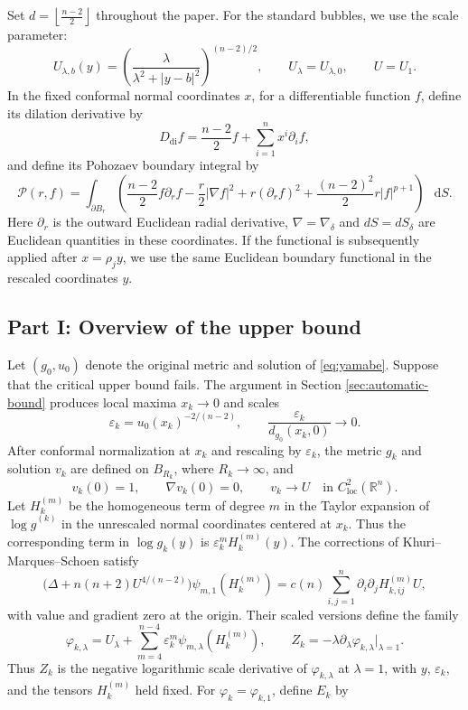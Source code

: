 \documentclass[11pt]{article}
\numberwithin{equation}{section}
\theoremstyle{remark}
\newcommand{\R}{\mathbb R}
\newcommand{\cP}{\mathcal P}
\newcommand{\dd}{\mathop{}\!\mathrm{d}}
\begin{document}
Set \(d=\left\lfloor\frac{n-2}{2}\right\rfloor\)
throughout the paper.
For the standard bubbles, we use the scale parameter:
\begin{equation}\label{eq:standard-bubble}
 U_{\lambda,b}(y)
 =\left(\frac{\lambda}{\lambda^2+|y-b|^2}\right)^{(n-2)/2},
 \qquad U_\lambda=U_{\lambda,0},\qquad U=U_1.
\end{equation}
In the fixed conformal normal coordinates \(x\), for a differentiable function \(f\), define its dilation derivative by
\begin{equation}\label{eq:dilation-operator}
 D_{\mathrm{di}}f=\frac{n-2}{2}f
 +\sum_{i=1}^nx^i\partial_i f,
\end{equation}
and define its
Pohozaev boundary integral by
\begin{equation}\label{eq:pohozaev}
 \cP(r,f)=\int_{\partial B_r}
 \left(\frac{n-2}{2}f\partial_r f-\frac r2|\nabla f|^2
       +r(\partial_r f)^2+\frac{(n-2)^2}{2}r|f|^{p+1}\right)\,\dd S.
\end{equation}
Here \(\partial_r\) is the outward Euclidean radial derivative, \(\nabla=\nabla_\delta\) and \(dS=dS_\delta\)
are Euclidean quantities in these coordinates. If the functional is subsequently applied after $x=\rho_j y$, we use the same Euclidean boundary functional in the rescaled
coordinates \(y\).


\subsection*{Part I: Overview of the upper bound}


Let \((g_0,u_0)\) denote the original metric and solution of \eqref{eq:yamabe}.
Suppose that the critical upper bound fails. The argument in
Section  \ref{sec:automatic-bound} produces local maxima \(x_k\to0\) and
scales
\[
 \varepsilon_k=u_0(x_k)^{-2/(n-2)},\qquad
 \frac{\varepsilon_k}{d_{g_0}(x_k,0)}\to0.
\]
After conformal normalization at \(x_k\) and rescaling by
\(\varepsilon_k\), the metric \(g_k\) and solution \(v_k\) are defined
on \(B_{R_k}\), where \(R_k\to\infty\), and
\[
 v_k(0)=1,\qquad \nabla v_k(0)=0,\qquad
 v_k\to U
 \quad\text{in }C^2_{\mathrm{loc}}(\R^n).
\]
Let \(H_k^{(m)}\) be the homogeneous term of degree \(m\) in the Taylor
expansion of \(\log\widehat g^{(k)}\) in the unrescaled normal coordinates
centered at \(x_k\). Thus the corresponding term in \(\log g_k(y)\) is
\(\varepsilon_k^mH_k^{(m)}(y)\). The corrections of
Khuri--Marques--Schoen  \cite{KMS} satisfy
\[
 \bigl(\Delta+n(n+2)U^{4/(n-2)}\bigr)
 \psi_{m,1}(H_k^{(m)})
 =c(n)\sum_{i,j=1}^n\partial_i\partial_jH_{k,ij}^{(m)}U,
\]
with value and gradient zero at the origin. Their scaled versions define
the family
\[
 \varphi_{k,\lambda}
 =U_\lambda+\sum_{m=4}^{n-4}\varepsilon_k^m
   \psi_{m,\lambda}(H_k^{(m)}),\qquad
 Z_k=-\lambda\partial_\lambda\varphi_{k,\lambda}
       \big|_{\lambda=1}.
\]
Thus \(Z_k\) is the negative logarithmic scale derivative of
\(\varphi_{k,\lambda}\) at \(\lambda=1\), with \(y\),
\(\varepsilon_k\), and the tensors \(H_k^{(m)}\) held fixed.
For \(\varphi_k=\varphi_{k,1}\), define 
\(E_k\) by
\end{document}
